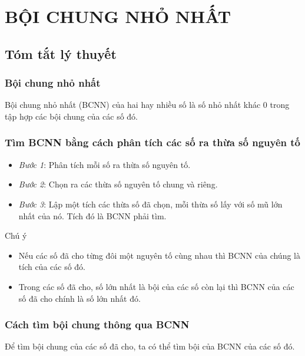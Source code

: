 \section{BỘI CHUNG NHỎ NHẤT}
\subsection{Tóm tắt lý thuyết}
\subsubsection{Bội chung nhỏ nhất}
\begin{dn}
	Bội chung nhỏ nhất (BCNN) của hai hay nhiều số là số nhỏ nhất khác $0$ trong tập hợp các bội chung của các số đó.
\end{dn}
\subsubsection{Tìm BCNN bằng cách phân tích các số ra thừa số nguyên tố}
\begin{itemize}
	\item \textit{Bước 1}: Phân tích mỗi số ra thừa số nguyên tố.
	\item \textit{Bước 2}: Chọn ra các thừa số nguyên tố chung và riêng.
	\item \textit{Bước 3}: Lập một tích các thừa số đã chọn, mỗi thừa số lấy với số mũ lớn nhất của nó. Tích đó là BCNN phải tìm.
\end{itemize}
\begin{note}{Chú ý}
	\begin{itemize}
		\item Nếu các số đã cho từng đôi một nguyên tố cùng nhau thì BCNN của chúng là tích của các số đó.
		\item Trong các số đã cho, số lớn nhất là bội của các số còn lại thì BCNN của các số đã cho chính là số lớn nhất đó.
	\end{itemize}
\end{note}
\subsubsection{Cách tìm bội chung thông qua BCNN}
Để tìm bội chung của các số đã cho, ta có thể tìm bội của BCNN của các số đó.
